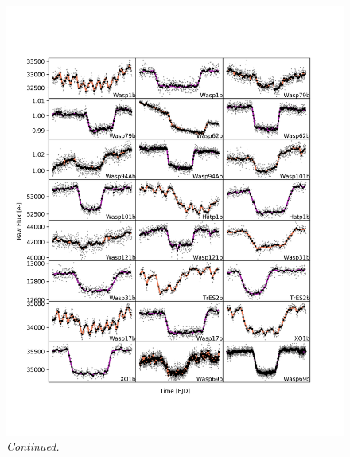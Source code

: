 \begin{subappendices}
  \addtocounter{figure}{-1}
  \begin{figure}
      \label{P1:fig:rawlc1}
    \includegraphics[width=\textwidth]{RawLighctuves1.pdf}
    \caption{\textit{Continued.}}
  \end{figure}


\end{subappendices}
